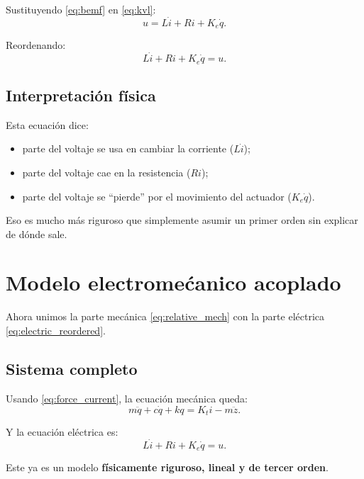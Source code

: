 \documentclass[11pt]{article}
\begin{document}
Sustituyendo \eqref{eq:bemf} en \eqref{eq:kvl}:
\begin{equation}
u = L\dot{i} + Ri + K_e\dot{q}.
\label{eq:electric}
\end{equation}

Reordenando:
\begin{equation}
L\dot{i} + Ri + K_e\dot{q} = u.
\label{eq:electric_reordered}
\end{equation}

\subsection{Interpretaci\'on f\'isica}

Esta ecuaci\'on dice:

\begin{itemize}[leftmargin=1.2cm]
\item parte del voltaje se usa en cambiar la corriente ($L\dot{i}$);
\item parte del voltaje cae en la resistencia ($Ri$);
\item parte del voltaje se ``pierde'' por el movimiento del actuador ($K_e\dot{q}$).
\end{itemize}

Eso es mucho m\'as riguroso que simplemente asumir un primer orden sin explicar de d\'onde sale.

\section{Modelo electrome\'canico acoplado}

Ahora unimos la parte mec\'anica \eqref{eq:relative_mech} con la parte el\'ectrica \eqref{eq:electric_reordered}.

\subsection{Sistema completo}

Usando \eqref{eq:force_current}, la ecuaci\'on mec\'anica queda:
\begin{equation}
m\ddot{q} + c\dot{q} + kq = K_t i - m\ddot{z}.
\label{eq:full_mech}
\end{equation}

Y la ecuaci\'on el\'ectrica es:
\begin{equation}
L\dot{i} + Ri + K_e\dot{q} = u.
\label{eq:full_elec}
\end{equation}

Este ya es un modelo \textbf{f\'isicamente riguroso, lineal y de tercer orden}.
\end{document}
